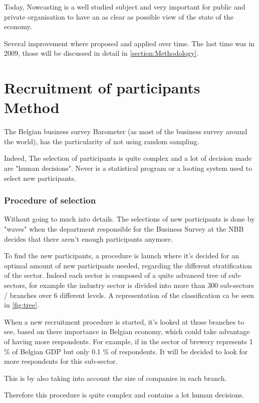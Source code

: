 \documentclass[12pt,a4paper,oneside]{book}
\begin{document}
Today, Nowcasting is a well studied subject and very important for public and private organisation to have an as clear as possible view of the state of the economy.

Several improvement where proposed and applied over time. The last time was in 2009, those will be discussed in detail in \autoref{section:Methodology}.



\section{Recruitment of participants Method}

The Belgian business survey Barometer (as most of the business survey around the world), has the particularity of not using random sampling.

Indeed, The selection of participants is quite complex and a lot of decision made are "human decisions". Never is a statistical program or a looting system used to select new participants.

\subsubsection*{Procedure of selection}

Without going to much into details. The selections of new participants is done by "waves" when the department responsible for the Business Survey at the NBB decides that there aren't enough participants anymore. 

To find the new participants, a procedure is launch where it's decided for an optimal amount of new participants needed, regarding the different stratification of the sector.
Indeed each sector is composed of a quite advanced tree of sub-sectors, for example the industry sector is divided into more than 300 sub-sectors / branches over 6 different levels. A representation of the classification ca be seen in \autoref{fig:tree}.

When a new recruitment procedure is started, it's looked at those branches to see, based on there importance in Belgian economy, which could take advantage of having more respondents. For example, if in the sector of brewery represents 1 \% of Belgian GDP but only 0.1 \% of respondents. It will be decided to look for more respondents for this sub-sector.

This is by also taking into account the size of companies in each branch. 

Therefore this procedure is quite complex and contains a lot human decisions.
\end{document}
